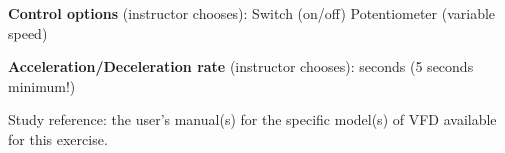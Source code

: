 \vskip 10pt

\noindent
{\bf Control options} (instructor chooses): \hskip 20pt \underbar{\hskip 20pt} Switch (on/off) \hskip 20pt \underbar{\hskip 20pt} Potentiometer (variable speed)

\vskip 10pt

\noindent
{\bf Acceleration/Deceleration rate} (instructor chooses): \hskip 20pt \underbar{\hskip 20pt} seconds (5 seconds minimum!)

\vfil

Study reference: the user's manual(s) for the specific model(s) of VFD available for this exercise.

\eject

















